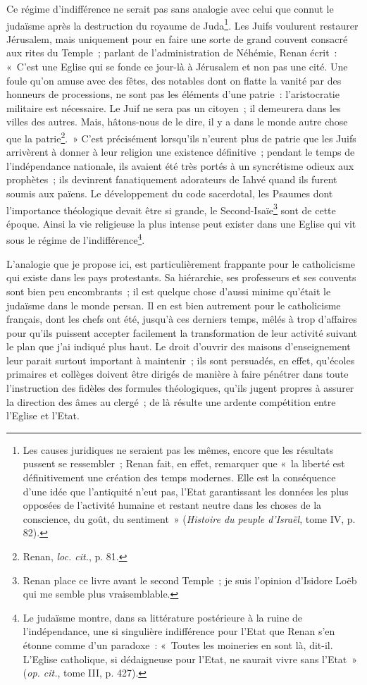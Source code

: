 \documentclass[french,twoside]{book} %
\begin{document}
Ce régime d’indifférence ne serait pas sans analogie avec celui que connut le judaïsme après la destruction du royaume de Juda\footnote{ \noindent Les causes juridiques ne seraient pas les mêmes, encore que les résultats pussent se ressembler ; Renan fait, en effet, remarquer que « la liberté est définitivement une création des temps modernes. Elle est la conséquence d’une idée que l’antiquité n’eut pas, l’Etat garantissant les données les plus opposées de l’activité humaine et restant neutre dans les choses de la conscience, du goût, du sentiment » (\emph{Histoire du peuple d’Israël}, tome IV, p. 82).
 }. Les Juifs voulurent restaurer Jérusalem, mais uniquement pour en faire une sorte de grand couvent consacré aux rites du Temple ; parlant de l’administration de Néhémie, Renan écrit : « C’est une Eglise qui se fonde ce jour-là à Jérusalem et non pas une cité. Une foule qu’on amuse avec des fêtes, des notables dont on flatte la vanité par des honneurs de processions, ne sont pas les éléments d’une patrie : l’aristocratie militaire est nécessaire. Le Juif ne sera pas un citoyen ; il  demeurera dans les villes des autres. Mais, hâtons-nous de le dire, il y a dans le monde autre chose que la patrie\footnote{ \noindent Renan, \emph{loc. cit.}, p. 81.
 }. » C’est précisément lorsqu’ils n’eurent plus de patrie que les Juifs arrivèrent à donner à leur religion une existence définitive ; pendant le temps de l’indépendance nationale, ils avaient été très portés à un syncrétisme odieux aux prophètes ; ils devinrent fanatiquement adorateurs de Iahvé quand ils furent soumis aux païens. Le développement du code sacerdotal, les Psaumes dont l’importance théologique devait être si grande, le Second-Isaïe\footnote{ \noindent Renan place ce livre avant le second Temple ; je suis l’opinion d’Isidore Loëb qui me semble plus vraisemblable.
 } sont de cette époque. Ainsi la vie religieuse la plus intense peut exister dans une Eglise qui vit sous le régime de l’indifférence\footnote{ \noindent Le judaïsme montre, dans sa littérature postérieure à la ruine de l’indépendance, une si singulière indifférence pour l’Etat que Renan s’en étonne comme d’un paradoxe : « Toutes les moineries en sont là, dit-il. L’Eglise catholique, si dédaigneuse pour l’Etat, ne saurait vivre sans l’Etat » (\emph{op. cit.}, tome III, p. 427).
 }.\par
L’analogie que je propose ici, est particulièrement frappante pour le catholicisme qui existe dans les pays protestants. Sa hiérarchie, ses professeurs et ses couvents sont bien peu encombrants ; il est quelque chose d’aussi minime qu’était le judaïsme dans le monde persan. Il en est bien autrement pour le catholicisme français, dont les chefs ont été, jusqu’à ces derniers temps, mêlés à trop d’affaires pour qu’ils puissent accepter facilement la transformation de leur activité suivant le plan que j’ai  indiqué plus haut. Le droit d’ouvrir des maisons d’enseignement leur parait surtout important à maintenir ; ils sont persuadés, en effet, qu’écoles primaires et collèges doivent être dirigés de manière à faire pénétrer dans toute l’instruction des fidèles des formules théologiques, qu’ils jugent propres à assurer la direction des âmes au clergé ; de là résulte une ardente compétition entre l’Eglise et l’Etat.\par
\end{document}
